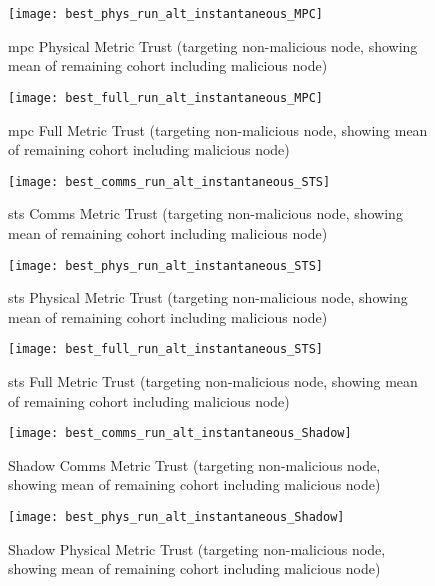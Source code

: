 \begin{figure}[h]
  \centering
  \texttt{[image: best\_phys\_run\_alt\_instantaneous\_MPC]}
  \caption{\gls{mpc} Physical Metric Trust (targeting non-malicious node, showing mean of remaining cohort including malicious node)}
  \label{fig:phys_alt_instantaneous_mpc}
\end{figure}

\begin{figure}[h]
  \centering
  \texttt{[image: best\_full\_run\_alt\_instantaneous\_MPC]}
  \caption{\gls{mpc} Full Metric Trust (targeting non-malicious node, showing mean of remaining cohort including malicious node)}
  \label{fig:full_alt_instantaneous_mpc}
\end{figure}


\begin{figure}[h]
  \centering
  \texttt{[image: best\_comms\_run\_alt\_instantaneous\_STS]}
  \caption{\gls{sts} Comms Metric Trust (targeting non-malicious node, showing mean of remaining cohort including malicious node)}
  \label{fig:comms_alt_instantaneous_sts}
\end{figure}

\begin{figure}[h]
  \centering
  \texttt{[image: best\_phys\_run\_alt\_instantaneous\_STS]}
  \caption{\gls{sts} Physical Metric Trust (targeting non-malicious node, showing mean of remaining cohort including malicious node)}
  \label{fig:phys_alt_instantaneous_sts}
\end{figure}

\begin{figure}[h]
  \centering
  \texttt{[image: best\_full\_run\_alt\_instantaneous\_STS]}
  \caption{\gls{sts} Full Metric Trust (targeting non-malicious node, showing mean of remaining cohort including malicious node)}
  \label{fig:full_alt_instantaneous_sts}
\end{figure}



\begin{figure}[h]
  \centering
  \texttt{[image: best\_comms\_run\_alt\_instantaneous\_Shadow]}
  \caption{Shadow Comms Metric Trust (targeting non-malicious node, showing mean of remaining cohort including malicious node)}
  \label{fig:comms_alt_instantaneous_shadow}
\end{figure}

\begin{figure}[h]
  \centering
  \texttt{[image: best\_phys\_run\_alt\_instantaneous\_Shadow]}
  \caption{Shadow Physical Metric Trust (targeting non-malicious node, showing mean of remaining cohort including malicious node)}
  \label{fig:phys_alt_instantaneous_shadow}
\end{figure}

